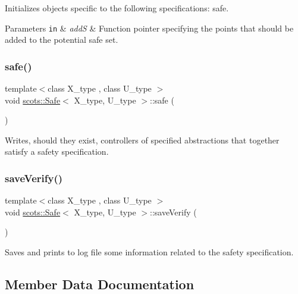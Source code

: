 Initializes objects specific to the following specifications\+: safe. 
\begin{DoxyParams}[1]{Parameters}
\mbox{\tt in}  & {\em addS} & Function pointer specifying the points that should be added to the potential safe set. \\
\hline
\end{DoxyParams}
\mbox{\label{classscots_1_1Safe_af5ea22ef6bd1f86dd1a6f7ef6e590492}} 
\subsubsection{\texorpdfstring{safe()}{safe()}}
{\footnotesize\ttfamily template$<$class X\+\_\+type , class U\+\_\+type $>$ \\
void \hyperlink{classscots_1_1Safe}{scots\+::\+Safe}$<$ X\+\_\+type, U\+\_\+type $>$\+::safe (\begin{DoxyParamCaption}{ }\end{DoxyParamCaption})\hspace{0.3cm}{\ttfamily [inline]}}

Writes, should they exist, controllers of specified abstractions that together satisfy a safety specification. \mbox{\label{classscots_1_1Safe_ab6866ae8860c91feb49467556f0a8598}} 
\subsubsection{\texorpdfstring{save\+Verify()}{saveVerify()}}
{\footnotesize\ttfamily template$<$class X\+\_\+type , class U\+\_\+type $>$ \\
void \hyperlink{classscots_1_1Safe}{scots\+::\+Safe}$<$ X\+\_\+type, U\+\_\+type $>$\+::save\+Verify (\begin{DoxyParamCaption}{ }\end{DoxyParamCaption})\hspace{0.3cm}{\ttfamily [inline]}}

Saves and prints to log file some information related to the safety specification. 

\subsection{Member Data Documentation}
\mbox{\label{classscots_1_1Safe_a30e38b9a75a8bf34efb2512465ea9468}} 
